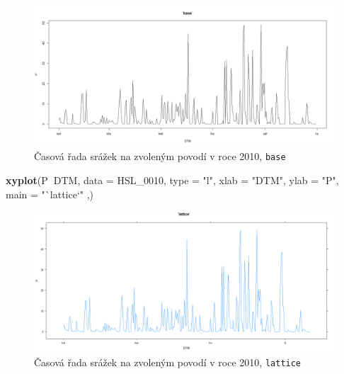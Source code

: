 \documentclass[12pt,]{article}
\newenvironment{Shaded}{\begin{snugshade}}{\end{snugshade}}
\newcommand{\KeywordTok}[1]{\textcolor[rgb]{0.13,0.29,0.53}{\textbf{#1}}}
\newcommand{\DataTypeTok}[1]{\textcolor[rgb]{0.13,0.29,0.53}{#1}}
\newcommand{\DecValTok}[1]{\textcolor[rgb]{0.00,0.00,0.81}{#1}}
\newcommand{\StringTok}[1]{\textcolor[rgb]{0.31,0.60,0.02}{#1}}
\newcommand{\OperatorTok}[1]{\textcolor[rgb]{0.81,0.36,0.00}{\textbf{#1}}}
\newcommand{\NormalTok}[1]{#1}
\begin{document}
\begin{Shaded}
\end{Shaded}

\begin{figure}[H]
      \includegraphics[width=\textwidth]{fig/1base}
      \caption{Časová řada srážek na zvoleným povodí v roce 2010, \texttt{base}}
      \label{fig:ch4.1a}
\end{figure}

\begin{Shaded}
\begin{Highlighting}[]
\KeywordTok{xyplot}\NormalTok{(P}\OperatorTok{~}\NormalTok{DTM, }\DataTypeTok{data =}\NormalTok{ HSL_}\DecValTok{0010}\NormalTok{, }\DataTypeTok{type =} \StringTok{"l"}\NormalTok{, }
                               \DataTypeTok{xlab =} \StringTok{"DTM"}\NormalTok{, }\DataTypeTok{ylab =} \StringTok{"P"}\NormalTok{, }
                               \DataTypeTok{main =} \StringTok{"`lattice`"}\NormalTok{ ,)}
\end{Highlighting}
\end{Shaded}

\begin{figure}[H]
      \includegraphics[width=\textwidth]{fig/2lattice}
      \caption{Časová řada srážek na zvoleným povodí v roce 2010, \texttt{lattice}}
      \label{fig:ch4.1b}
\end{figure}
\end{document}
